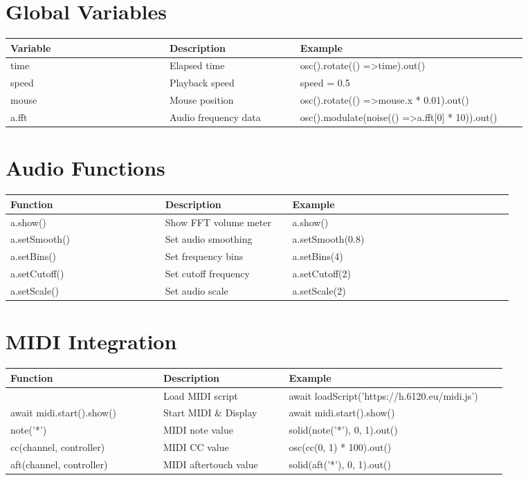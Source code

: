 \documentclass[9pt,oneside]{amsart}
\begin{document}
\section*{Global Variables}
\begin{tabular}{L{0.28\linewidth}L{0.23\linewidth}L{0.40\linewidth}}
\toprule
\textbf{Variable} & \textbf{Description} & \textbf{Example} \\
\midrule
time & Elapsed time & osc().rotate(() =\textgreater  time).out() \\
speed & Playback speed & speed = 0.5 \\
mouse & Mouse position & osc().rotate(() =\textgreater  mouse.x * 0.01).out() \\
a.fft & Audio frequency data & osc().modulate(noise(() =\textgreater  a.fft[0] * 10)).out() \\
\bottomrule
\end{tabular}

\section*{Audio Functions}
\begin{tabular}{L{0.28\linewidth}L{0.23\linewidth}L{0.40\linewidth}}
\toprule
\textbf{Function} & \textbf{Description} & \textbf{Example} \\
\midrule
a.show() & Show FFT volume meter & a.show() \\
a.setSmooth() & Set audio smoothing & a.setSmooth(0.8) \\
a.setBins() & Set frequency bins & a.setBins(4) \\
a.setCutoff() & Set cutoff frequency & a.setCutoff(2) \\
a.setScale() & Set audio scale & a.setScale(2) \\
\bottomrule
\end{tabular}

\section*{MIDI Integration}
\begin{tabular}{L{0.28\linewidth}L{0.23\linewidth}L{0.40\linewidth}}
\toprule
\textbf{Function} & \textbf{Description} & \textbf{Example} \\
\midrule
 & Load MIDI script & await loadScript('https://h.6120.eu/midi.js') \\
await midi.start().show() & Start MIDI \& Display & await midi.start().show() \\
note('*') & MIDI note value & solid(note('*'), 0, 1).out() \\
cc(channel, controller) & MIDI CC value & osc(cc(0, 1) * 100).out() \\
aft(channel, controller) & MIDI aftertouch value & solid(aft('*'), 0, 1).out() \\
\bottomrule
\end{tabular}
\end{document}
